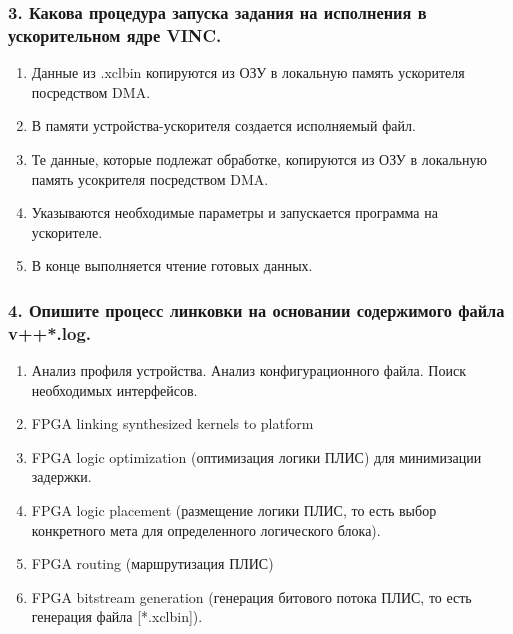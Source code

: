 \subsubsection{\textbf{3. Какова процедура запуска задания на исполнения в ускорительном ядре VINC.}}
\begin{enumerate}
	\item Данные из .xclbin копируются из ОЗУ в локальную память ускорителя посредством DMA.
	\item В памяти устройства-ускорителя создается исполняемый файл.
	\item Те данные, которые подлежат обработке, копируются из ОЗУ в локальную память усокрителя посредством DMA.
	\item Указываются необходимые параметры и запускается программа на ускорителе.
	\item В конце выполняется чтение готовых данных. 
\end{enumerate}

\subsubsection{\textbf{4. Опишите процесс линковки на основании содержимого файла v++*.log.}}
\begin{enumerate}
	\item Анализ профиля устройства. Анализ конфигурационного файла. Поиск необходимых интерфейсов.
	\item FPGA linking synthesized kernels to platform
	\item FPGA logic optimization (оптимизация логики ПЛИС) для минимизации задержки.
	\item FPGA logic placement (размещение логики ПЛИС, то есть выбор конкретного мета для определенного логического блока). 
	\item FPGA routing (маршрутизация ПЛИС)
	\item FPGA bitstream generation (генерация битового потока ПЛИС, то есть генерация файла  [*.xclbin]).
\end{enumerate}